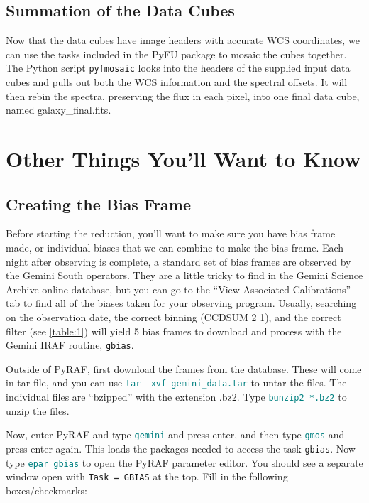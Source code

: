 \documentclass[12pt]{report}
\newcommand{\ty}[1]{\textcolor{teal}{\texttt{#1}}}
\begin{document}
\bigskip
\section{Summation of the Data Cubes}

Now that the data cubes have image headers with accurate WCS coordinates, we can use the tasks included in the PyFU package to mosaic the cubes together. The Python script \texttt{pyfmosaic} looks into the headers of the supplied input data cubes and pulls out both the WCS information and the spectral offsets. It will then rebin the spectra, preserving the flux in each pixel, into one final data cube, named galaxy\_final.fits.

\chapter{Other Things You'll Want to Know}

\section{Creating the Bias Frame}
\label{bias}

Before starting the reduction, you'll want to make sure you have bias frame made, or individual biases that we can combine to make the bias frame. Each night after observing is complete, a standard set of bias frames are observed by the Gemini South operators. They are a little tricky to find in the Gemini Science Archive online database, but you can go to the ``View Associated Calibrations'' tab to find all of the biases taken for your observing program. Usually, searching on the observation date, the correct binning (CCDSUM 2 1), and the correct filter (see \autoref{table:1}) will yield 5 bias frames to download and process with the Gemini IRAF routine, \texttt{gbias}.

Outside of PyRAF, first download the frames from the database. These will come in tar file, and you can use \ty{tar -xvf gemini\_data.tar} to untar the files. The individual files are ``bzipped'' with the extension .bz2. Type \ty{bunzip2 *.bz2} to unzip the files.

Now, enter PyRAF and type \ty{gemini} and press enter, and then type \ty{gmos} and press enter again. This loads the packages needed to access the task \texttt{gbias}. Now type \ty{epar gbias} to open the PyRAF parameter editor. You should see a separate window open with \texttt{Task = GBIAS} at the top. Fill in the following boxes/checkmarks:
\end{document}
